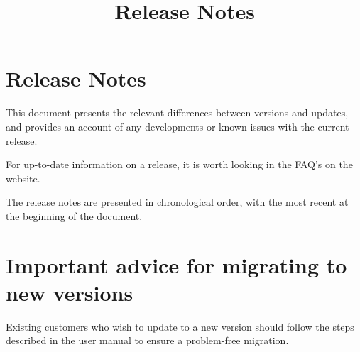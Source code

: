 
\title{Release Notes}
\author*{}{}
\maketitle

\setcounter{secnumdepth}{0}

\clearpage
\section{Release Notes}
This document presents the relevant differences between versions and updates, and provides an account of any developments or known issues with the current release. 

For up-to-date information on a release, it is worth looking in the FAQ's on the website. 

The release notes are presented in chronological order, with the most recent at the beginning of the document.  

\section{Important advice for migrating to new  versions}
Existing customers who wish to update to a new version should follow the steps described in the user manual to ensure a problem-free migration.






